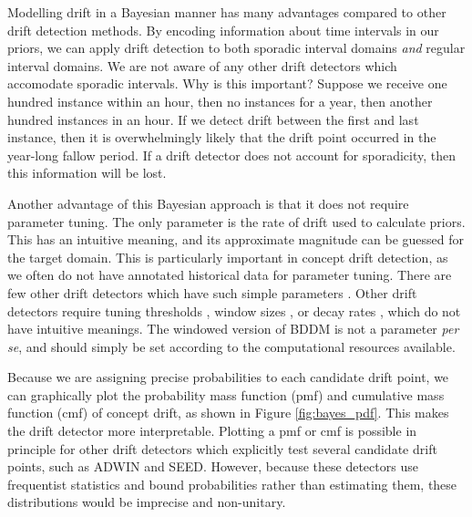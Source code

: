 Modelling drift in a Bayesian manner has many advantages compared to other drift detection methods. By encoding information about time intervals in our priors, we can apply drift detection to both sporadic interval domains {\it and} regular interval domains. We are not aware of any other drift detectors which accomodate sporadic intervals. Why is this important? Suppose we receive one hundred instance within an hour, then no instances for a year, then another hundred instances in an hour. If we detect drift between the first and last instance, then it is overwhelmingly likely that the drift point occurred in the year-long fallow period. If a drift detector does not account for sporadicity, then this information will be lost.

Another advantage of this Bayesian approach is that it does not require parameter tuning. The only parameter is the rate of drift used to calculate priors. This has an intuitive meaning, and its approximate magnitude can be guessed for the target domain. This is particularly important in concept drift detection, as we often do not have annotated historical data for parameter tuning. There are few other drift detectors which have such simple parameters \cite{DDM}\cite{CUSUM}. Other drift detectors require tuning thresholds \cite{ADWIN}\cite{HDDM}, window sizes \cite{STEPD}\cite{PL}, or decay rates \cite{HDDM}\cite{EWMA}, which do not have intuitive meanings. The windowed version of BDDM is not a parameter {\it per se}, and should simply be set according to the computational resources available.

Because we are assigning precise probabilities to each candidate drift point, we can graphically plot the probability mass function (pmf) and cumulative mass function (cmf) of concept drift, as shown in Figure \ref{fig:bayes_pdf}. This makes the drift detector more interpretable. Plotting a pmf or cmf is possible in principle for other drift detectors which explicitly test several candidate drift points, such as ADWIN and SEED. However, because these detectors use frequentist statistics and bound probabilities rather than estimating them, these distributions would be imprecise and non-unitary.



